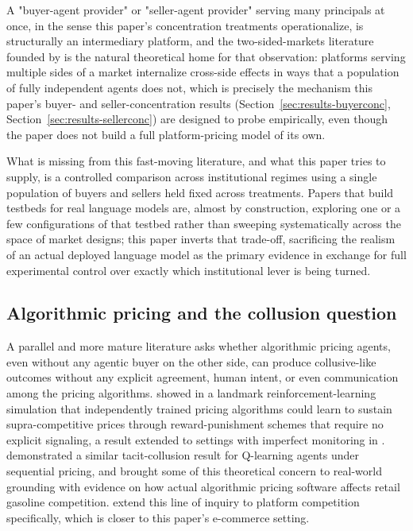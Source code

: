 \documentclass[review]{elsarticle}
\begin{document}
A "buyer-agent provider" or "seller-agent provider" serving many principals at once, in the sense this paper's concentration treatments operationalize, is structurally an intermediary platform, and the two-sided-markets literature founded by \citet{armstrong2006competition} is the natural theoretical home for that observation: platforms serving multiple sides of a market internalize cross-side effects in ways that a population of fully independent agents does not, which is precisely the mechanism this paper's buyer- and seller-concentration results (Section~\ref{sec:results-buyerconc}, Section~\ref{sec:results-sellerconc}) are designed to probe empirically, even though the paper does not build a full platform-pricing model of its own.

What is missing from this fast-moving literature, and what this paper tries to supply, is a controlled comparison across institutional regimes using a single population of buyers and sellers held fixed across treatments. Papers that build testbeds for real language models are, almost by construction, exploring one or a few configurations of that testbed rather than sweeping systematically across the space of market designs; this paper inverts that trade-off, sacrificing the realism of an actual deployed language model as the primary evidence in exchange for full experimental control over exactly which institutional lever is being turned.

\subsection{Algorithmic pricing and the collusion question}
\label{sec:litreview-collusion}

A parallel and more mature literature asks whether algorithmic pricing agents, even without any agentic buyer on the other side, can produce collusive-like outcomes without any explicit agreement, human intent, or even communication among the pricing algorithms. \citet{calvano2020artificial} showed in a landmark reinforcement-learning simulation that independently trained pricing algorithms could learn to sustain supra-competitive prices through reward-punishment schemes that require no explicit signaling, a result extended to settings with imperfect monitoring in \citet{calvano2021algorithmic}. \citet{klein2021autonomous} demonstrated a similar tacit-collusion result for Q-learning agents under sequential pricing, and \citet{brown2023competition} brought some of this theoretical concern to real-world grounding with evidence on how actual algorithmic pricing software affects retail gasoline competition. \citet{sanchezcartas2025ai} extend this line of inquiry to platform competition specifically, which is closer to this paper's e-commerce setting.
\end{document}
